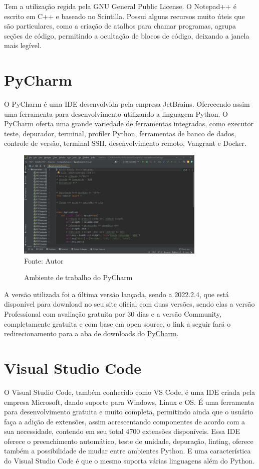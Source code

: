 	Tem a utilização regida pela GNU General Public License. O Notepad++ é escrito em C++ e baseado no Scintilla. Possui alguns recursos muito úteis que são particulares, como a criação de atalhos para chamar programas, agrupa seções de código, permitindo a ocultação de blocos de código, deixando a janela mais legível.
	
    \section{PyCharm}
    O PyCharm é uma IDE desenvolvida pela empresa JetBrains. Oferecendo assim uma ferramenta para desenvolvimento utilizando a linguagem Python. O PyCharm oferta uma grande variedade de ferramentas integradas, como executor teste, depurador, terminal, profiler Python, ferramentas de banco de dados, controle de versão, terminal SSH, desenvolvimento remoto, Vangrant e Docker.
    
    
    \begin{figure}[H]
    	\begin{center}
    		\caption{Ambiente de trabalho do PyCharm} \label{ling1}
    		\includegraphics[width=9cm]{pycharm.JPG} \\
    		{\tiny \sf Fonte:{ Autor}}
    	\end{center}
    \end{figure}
    
     A versão utilizada foi a última versão lançada, sendo a 2022.2.4, que está disponível para download no seu site oficial com duas versões, sendo elas a versão Professional com avaliação gratuita por 30 dias e a versão Community, completamente gratuita e com base em open source, o link a seguir fará o redirecionamento para a aba de downloads do \href{https://www.jetbrains.com/pt-br/pycharm/download/#section=windows}{PyCharm}.
    
    \section{Visual Studio Code}
	O Visual Studio Code, também conhecido como VS Code, é uma IDE criada pela empresa Microsoft, dando suporte para Windows, Linux e OS. É uma ferramenta para desenvolvimento 
	gratuita e muito completa, permitindo ainda que o usuário faça a adição de extensões, assim acrescentando componentes de acordo com a sua necessidade, contendo em seu total 4700 extensões disponíveis. Essa IDE oferece o preenchimento automático, teste de unidade, depuração, linting, oferece também a possibilidade de mudar entre ambientes Python. E uma característica do Visual Studio Code é que o mesmo suporta várias linguagens além do Python.
    
